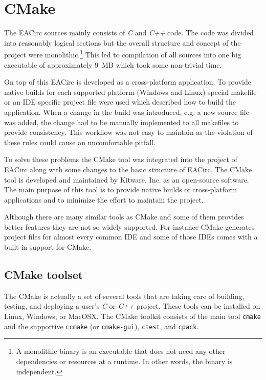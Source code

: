 \documentclass[12pt,oneside]{fithesis2}
\begin{document}
\chapter{CMake}
The EACirc sources mainly consists of \emph{C} and \emph{C++} code. The code was divided into reasonably logical sections but the overall structure and concept of the project were monolithic.\footnote{A monolithic binary is an executable that does not need any other dependencies or resources at a runtime. In other words, the binary is independent.} This led to compilation of all sources into one big executable of approximately 9~MB which took some non-trivial time.

On top of this EACirc is developed as a cross-platform application. To provide native builds for each supported platform (Windows \cite{win} and Linux) special makefile or an IDE specific project file were used which described how to build the application. When a change in the build was introduced, e.g. a new source file was added, the change had to be manually implemented to all makefiles to provide consistency. This workflow was not easy to maintain as the violation of these rules could cause an uncomfortable pitfall.

To solve these problems the CMake \cite{cmake} tool was integrated into the project of EACirc along with some changes to the basic structure of EACirc. The CMake tool is developed and maintained by Kitware, Inc. \cite{kitware} as an open-source software. The main purpose of this tool is to provide native builds of cross-platform applications and to minimize the effort to maintain the project.

Although there are many similar tools as CMake and some of them provides better features they are not so widely supported. For instance CMake generates project files for almost every common IDE and some of those IDEs comes with a built-in support for CMake.

\section{CMake toolset}

The CMake is actually a set of several tools that are taking care of building, testing, and deploying a user's \emph{C} or \emph{C++} project. These tools can be installed on Linux, Windows, or MacOSX. The CMake toolkit consists of the main tool \texttt{cmake} and the supportive \texttt{ccmake} (or \texttt{cmake-gui}), \texttt{ctest}, and \texttt{cpack}.
\end{document}
